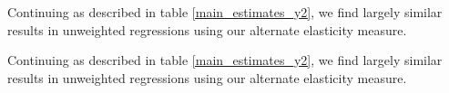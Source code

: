 \documentclass[12pt,a4paper]{article}
\begin{document}
\begin{table}[H]
	\begin{center}
		
		\label{demographic_estimates_y2}
		\caption[Alternate Demographic Predictor Estimates, Unweighted]{Continuing as described in table \ref{main_estimates_y2}, we find largely similar results in unweighted regressions using our alternate elasticity measure.}
	\end{center}
\end{table}

\begin{table}[H]
	\begin{center}
		
		\label{pop_share_estimates_y2}
		\caption[Alternate Cheaper Gas Border Predictor Estimates, Unweighted]{Continuing as described in table \ref{main_estimates_y2}, we find largely similar results in unweighted regressions using our alternate elasticity measure.}
	\end{center}
\end{table}
\end{document}
